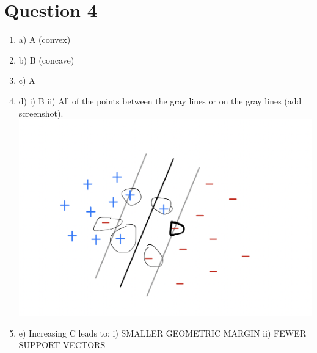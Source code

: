 \documentclass{article}
\theoremstyle{plain}
\theoremstyle{definition}
\begin{document}
\section{Question 4}
\begin{enumerate}
    \item a) A (convex)
    \item b) B (concave)
    \item c) A
    \item d) 
    \subitem i) B
    \subitem ii) All of the points between the gray lines or on the gray lines (add screenshot). 
    \includegraphics[scale=.5]{Support Vectors.png}
    \item e) Increasing C leads to: 
    \subitem i) SMALLER GEOMETRIC MARGIN
    \subitem ii) FEWER SUPPORT VECTORS
\end{enumerate}
\end{document}
